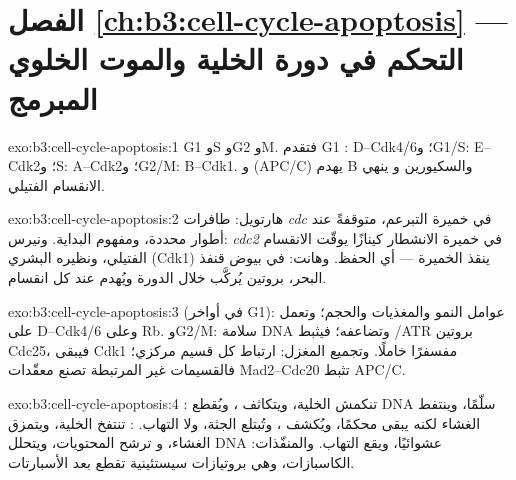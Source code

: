 \section*{الفصل \ref{ch:b3:cell-cycle-apoptosis} --- التحكم في دورة الخلية والموت الخلوي المبرمج}

\begin{solution}{exo:b3:cell-cycle-apoptosis:1}
G1 وS وG2 وM. فتقدم G1 :  D--Cdk4/6؛
وG1/S:  E--Cdk2؛ وS:  A--Cdk2؛ وG2/M:  B--Cdk1. و
 (APC/C) يهدم  B والسكيورين و
ينهي الانقسام الفتيلي.
\end{solution}

\begin{solution}{exo:b3:cell-cycle-apoptosis:2}
هارتويل: طافرات \emph{cdc} في خميرة التبرعم، متوقفةً عند أطوار
محددة، ومفهوم البداية. ونيرس: \emph{cdc2} في خميرة الانشطار
كينازًا يوقّت الانقسام الفتيلي، ونظيره البشري (Cdk1) ينقذ
الخميرة --- أي الحفظ. وهانت:  في بيوض قنفذ البحر، بروتين
يُركَّب خلال الدورة ويُهدم عند كل انقسام.
\end{solution}

\begin{solution}{exo:b3:cell-cycle-apoptosis:3}
 (في أواخر G1): عوامل النمو والمغذيات والحجم؛ وتعمل على
 D--Cdk4/6 وعلى Rb. وG2/M: سلامة DNA وتضاعفه؛ فيثبط /ATR
بروتين Cdc25، فيبقى Cdk1 مفسفرًا خاملًا. وتجميع
المغزل: ارتباط كل قسيم مركزي؛ فالقسيمات غير المرتبطة تصنع
معقّدات Mad2--Cdc20 تثبط APC/C.
\end{solution}

\begin{solution}{exo:b3:cell-cycle-apoptosis:4}
: تنكمش الخلية، ويتكاثف ، ويُقطع DNA سلّمًا،
وينتفط الغشاء لكنه يبقى محكمًا، ويُكشف ، وتُبتلع الجثة،
ولا التهاب. : تنتفخ الخلية، ويتمزق الغشاء، و
ترشح المحتويات، ويتحلل DNA عشوائيًا، ويقع التهاب. والمنفّذات:
الكاسبازات، وهي بروتيازات سيستئينية تقطع بعد الأسبارتات.
\end{solution}

